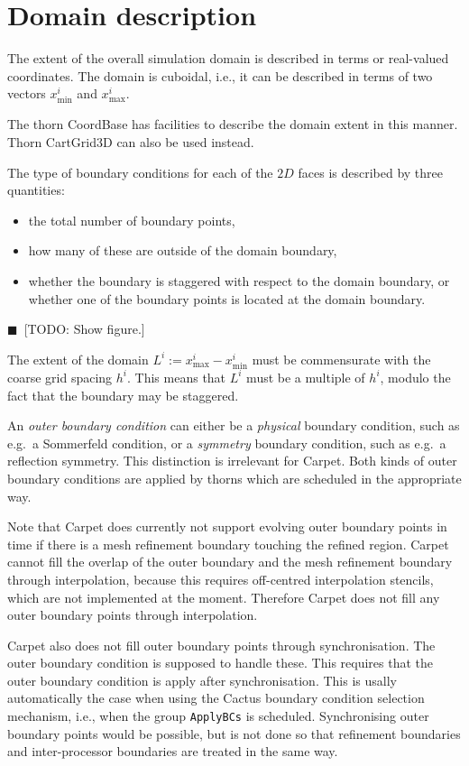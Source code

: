 \documentclass[nofootinbib, twocolumn]{revtex4}
\newcommand{\todo}[1]{{\color{blue}$\blacksquare$~\textsf{[TODO: #1]}}}
\begin{document}
\section{Domain description}

The extent of the overall simulation domain is described in terms or
real-valued coordinates.  The domain is cuboidal, i.e., it can be
described in terms of two vectors $x^i_\mathrm{min}$ and
$x^i_\mathrm{max}$.

The thorn \textrm{CoordBase} has facilities to describe the domain
extent in this manner.  Thorn \textrm{CartGrid3D} can also be used
instead.

The type of boundary conditions for each of the $2D$ faces is
described by three quantities:
\begin{itemize}
  \item the total number of boundary points,
  \item how many of these are outside of the domain boundary,
  \item whether the boundary is staggered with respect to the domain
    boundary, or whether one of the boundary points is located at the
    domain boundary.
\end{itemize}
\todo{Show figure.}

The extent of the domain $L^i := x^i_\mathrm{max} - x^i_\mathrm{min}$
must be commensurate with the coarse grid spacing $h^i$.  This means
that $L^i$ must be a multiple of $h^i$, modulo the fact that the
boundary may be staggered.

An \emph{outer boundary condition} can either be a \emph{physical}
boundary condition, such as e.g.\ a Sommerfeld condition, or a
\emph{symmetry} boundary condition, such as e.g.\ a reflection
symmetry.  This distinction is irrelevant for Carpet.  Both kinds of
outer boundary conditions are applied by thorns which are scheduled in
the appropriate way.

Note that Carpet does currently not support evolving outer boundary
points in time if there is a mesh refinement boundary touching the
refined region.  Carpet cannot fill the overlap of the outer boundary
and the mesh refinement boundary through interpolation, because this
requires off-centred interpolation stencils, which are not implemented
at the moment.  Therefore Carpet does not fill any outer boundary
points through interpolation.
  
Carpet also does not fill outer boundary points through
synchronisation.  The outer boundary condition is supposed to handle
these.  This requires that the outer boundary condition is apply after
synchronisation.  This is usally automatically the case when using the
Cactus boundary condition selection mechanism, i.e., when the group
\texttt{ApplyBCs} is scheduled.  Synchronising outer boundary points
would be possible, but is not done so that refinement boundaries and
inter-processor boundaries are treated in the same way.
\end{document}
